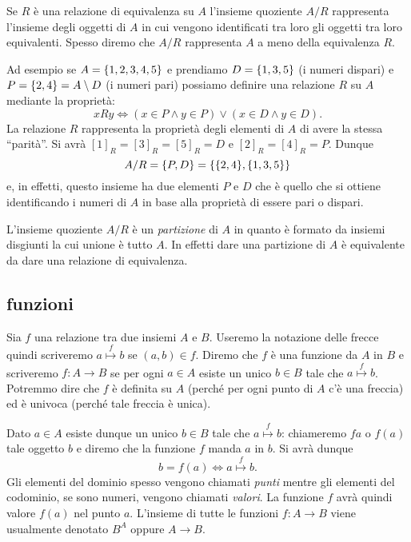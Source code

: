 Se $R$ è una relazione di equivalenza su $A$ 
l'insieme quoziente $A/R$ rappresenta l'insieme 
degli oggetti di $A$ in cui vengono identificati tra loro gli oggetti tra loro 
equivalenti.
Spesso diremo che $A/R$ rappresenta $A$ a meno della equivalenza $R$.

Ad esempio se $A={\left\{ 1,2,3,4,5 \right\}}$ e prendiamo $D={\left\{ 1,3,5 \right\}}$ (i numeri dispari)
e $P={\left\{ 2,4 \right\}}=A\setminus D$ 
(i numeri pari) possiamo definire una relazione $R$ su $A$ mediante la proprietà:
\[
 x R  y \iff (x\in P \land y\in P) \lor (x\in D \land y\in D).
\]
La relazione $R$ rappresenta la proprietà degli elementi di $A$ 
di avere la stessa ``parità''. 
Si avrà $[1]_R = [3]_R=[5]_R= D$ e $[2]_R=[4]_R=P$.
Dunque 
\[
   A/R = {\left\{ P,D \right\}} = {\left\{ {\left\{ 2,4 \right\}},{\left\{ 1,3,5 \right\}} \right\}}
\]
e, in effetti, questo insieme ha due elementi $P$ e $D$ che è quello 
che si ottiene identificando i numeri di $A$ in base alla proprietà 
di essere pari o dispari. 

L'insieme quoziente $A/R$ è un \emph{partizione}%
%
 di $A$ in quanto 
è formato da insiemi disgiunti la cui unione è tutto $A$. In effetti 
dare una partizione di $A$ è equivalente da dare una relazione 
di equivalenza.

\subsection{funzioni}

Sia $f$ una relazione tra due insiemi $A$ e $B$. 
Useremo la notazione delle frecce quindi scriveremo $a\stackrel f\mapsto b$ 
se $(a,b)\in f$. 
Diremo che $f$ è una funzione da $A$ in $B$ e scriveremo 
$f\colon A\to B$ se per ogni $a\in A$ esiste un unico $b\in B$ 
tale che $a \stackrel f \mapsto b$.
Potremmo dire che $f$ è definita su $A$ 
(perché per ogni punto di $A$ c'è una freccia)
ed è univoca (perché tale freccia è unica).

Dato $a\in A$ esiste dunque un unico $b\in B$ tale che
$a\stackrel f \mapsto b$: chiameremo $fa$
o $f(a)$ 
%
tale oggetto $b$
e diremo che la funzione $f$ manda $a$ in $b$. 
Si avrà dunque
\[
 b=f(a) \iff a\stackrel f \mapsto b.
\]
Gli elementi del dominio spesso vengono chiamati \emph{punti}
mentre gli elementi del codominio, se sono numeri, vengono 
chiamati \emph{valori}. 
La funzione $f$ avrà quindi valore $f(a)$ nel punto $a$.
L'insieme di tutte le funzioni $f\colon A\to B$ viene usualmente denotato $B^A$
oppure $A\to B$.
%
%
%
%

